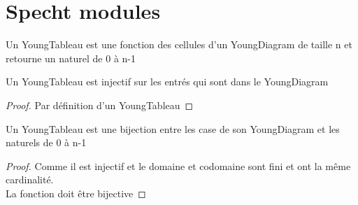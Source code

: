 \chapter{Specht modules}

\begin{definition}[YoungTableau]
    \label{YoungTableau}
    \leanok
    Un YoungTableau est une fonction des cellules d'un YoungDiagram de taille n et retourne un naturel de 0 à n-1
\end{definition}

\begin{theorem}[injYu]
    \label{injYu}
    \leanok
    Un YoungTableau est injectif sur les entrés qui sont dans le YoungDiagram
\end{theorem}
\begin{proof}
    \leanok
    Par définition d'un YoungTableau
\end{proof}


\begin{theorem}[bijYu]
    \label{bijYu}
    \leanok
    Un YoungTableau est une bijection entre les case de son YoungDiagram et les naturels de 0 à n-1
\end{theorem}
\begin{proof}
    \leanok
    Comme il est injectif et le domaine et codomaine sont fini et ont la même cardinalité.\\
    La fonction doit être bijective
\end{proof}

